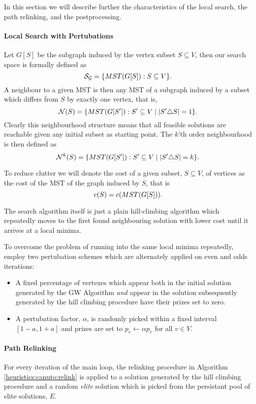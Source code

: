 In this section we will
 describe further the characteristics of the local search, the
 path relinking, and the postprocessing.
\paragraph{Local Search with Pertubations}
Let $G[S]$ be the subgraph induced by the vertex subset $S \subseteq V$, then
 our search space is formally defined as
$$\mathcal{S_G} = \{MST(G[S]) : S \subseteq V \}\mathnormal{.}$$
A neighbour to a given MST is then any MST of a subgraph induced by a subset which differs from $S$
 by exactly one vertex, that is,
$$\mathcal{N}(S) = \{MST(G[S']) : S' \subseteq V \mid |S' \triangle S| = 1 \}\mathnormal{.}$$ 
Clearly this neighbourhood structure means that all feasible solutions are reachable
given any initial subset as starting point. The $k$'th order neighbourhood is then defined as
$$\mathcal{N}^k(S) = \{MST(G[S']) : S' \subseteq V \mid |S' \triangle S| = k \}\mathnormal{.}$$ 

To reduce clutter we will denote the cost
of a given subset, $S \subseteq V$, of vertices as the cost
of the MST of the graph induced by $S$, that is
$$c(S) = c(MST(G[S]))\mathnormal{.}$$

The search algorithm itself is just a plain hill-climbing algorithm which repeatedly
 moves to the first
 found neighbouring solution with lower cost until it arrives at a local minima.

 To overcome the problem of running into the same local minima repeatedly,
 \cite{canuto2001local} employ two pertubation schemes which are alternately applied
 on even and odds iterations:
 \begin{itemize}
 \item A fixed percentage of vertexes which appear both in the initial solution generated
   by the GW Algorithm \textit{and} appear in the solution subsequently generated by
    the hill climbing procedure have their prizes
    set to zero.
  \item A pertubation factor, $\alpha$, is randomly picked within a fixed interval $[1 -a, 1+a]$
    and prizes are set to $p_v \gets \alpha p_v$ for all $v \in V$.
 \end{itemize}

\paragraph{Path Relinking}
For every iteration of the main loop, the relinking procedure in Algorithm \ref{heuristics:canuto:relink}
is applied to a solution generated by the hill climbing procedure and 
a random \textit{elite} solution which is picked from the
persistant pool of elite solutions, $E$.

